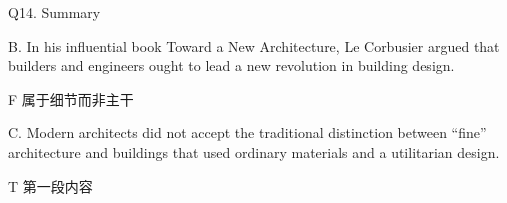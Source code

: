 \begin{blk}
    \begin{qst}
        Q14. Summary
    \end{qst}

    \begin{chc}
        B. In his influential book Toward a New Architecture, Le Corbusier argued that builders and engineers ought to lead a new revolution in building design.
    \end{chc}

    \begin{nlz}
        F 属于细节而非主干
    \end{nlz}

    \begin{chc}
        C. Modern architects did not accept the traditional distinction between “fine” architecture and buildings that used ordinary materials and a utilitarian design.
    \end{chc}

    \begin{nlz}
        T 第一段内容
    \end{nlz}
\end{blk}
